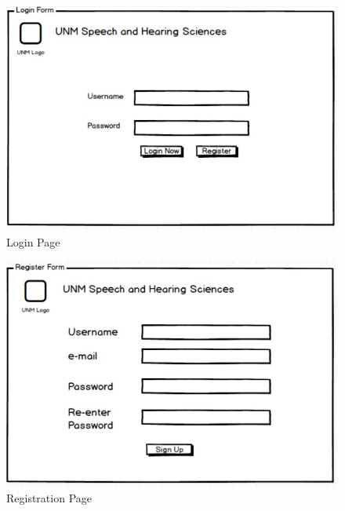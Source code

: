\documentclass[12pt, a4paper, oneside]{article}
\begin{document}
\begin{figure}
\centering
\includegraphics[width=\textwidth,height=\textheight,keepaspectratio]{./images/Wireframes/Login.jpg}
\caption{Login Page}
\end{figure}

\begin{figure}
\centering
\includegraphics[width=\textwidth,height=\textheight,keepaspectratio]{./images/Wireframes/Register.jpg}
\caption{Registration Page}
\end{figure}
\end{document}
